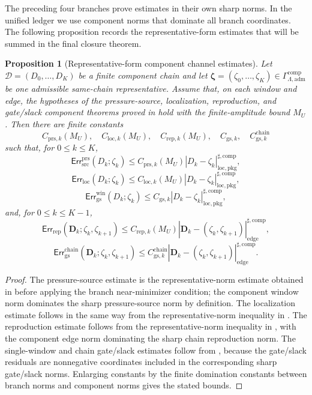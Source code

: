 \documentclass[11pt]{article}
\numberwithin{equation}{section}
\newtheorem{proposition}[proposition]{Proposition}
\theoremstyle{definition}
\theoremstyle{remark}
\newcommand{\loc}{\mathrm{loc}}
\newcommand{\pkg}{\mathrm{pkg}}
\newcommand{\adm}{\mathrm{adm}}
\newcommand{\prs}{\mathrm{prs}}
\newcommand{\src}{\mathrm{src}}
\newcommand{\rep}{\mathrm{rep}}
\newcommand{\gs}{\mathrm{gs}}
\newcommand{\locerr}{\mathrm{loc}}
\newcommand{\comp}{\mathrm{comp}}
\newcommand{\chain}{\mathrm{chain}}
\newcommand{\Err}{\mathsf{Err}}
\newcommand{\calD}{\mathcal D}
\newcommand{\bfD}{\mathbf D}
\newcommand{\bzeta}{\boldsymbol\zeta}
\newcommand{\Gcomp}{\Gamma_{\Lambda,\adm}^{\comp}}
\begin{document}
The preceding four branches prove estimates in their own sharp norms.  In the
unified ledger we use component norms that dominate all branch coordinates.  The
following proposition records the representative-form estimates that will be
summed in the final closure theorem.

\begin{proposition}[Representative-form component channel estimates]
\label{comp:prop:component-channel-estimates}
Let \(\calD=(D_0,\ldots,D_K)\) be a finite component chain and let
\(\bzeta=(\zeta_0,\ldots,\zeta_K)\in\Gcomp\) be one admissible same-chain
representative.  Assume that, on each window and edge, the hypotheses of the
pressure-source, localization, reproduction, and gate/slack component theorems
proved in  hold with the finite-amplitude
bound \(M_U\).  Then there are finite constants
\[
    C_{{\prs},k}(M_U),\quad
    C_{{\locerr},k}(M_U),\quad
    C_{{\rep},k}(M_U),\quad
    C_{{\gs},k},\quad
    C_{{\gs},k}^{\chain}
\]
such that, for \(0\le k\le K\),
\[
    \Err_{\src}^{\prs}(D_k;\zeta_k)
    \le
    C_{{\prs},k}(M_U)
    |D_k-\zeta_k|_{\loc,\pkg}^{\sharp,\comp},
\]
\[
    \Err_{\locerr}(D_k;\zeta_k)
    \le
    C_{{\locerr},k}(M_U)
    |D_k-\zeta_k|_{\loc,\pkg}^{\sharp,\comp},
\]
\[
    \Err_{\gs}^{\mathrm{win}}(D_k;\zeta_k)
    \le
    C_{{\gs},k}
    |D_k-\zeta_k|_{\loc,\pkg}^{\sharp,\comp},
\]
and, for \(0\le k\le K-1\),
\[
    \Err_{\rep}(\bfD_k;\zeta_k,\zeta_{k+1})
    \le
    C_{{\rep},k}(M_U)
    |\bfD_k-(\zeta_k,\zeta_{k+1})|_{\mathrm{edge}}^{\sharp,\comp},
\]
\[
    \Err_{\gs}^{\chain}(\bfD_k;\zeta_k,\zeta_{k+1})
    \le
    C_{{\gs},k}^{\chain}
    |\bfD_k-(\zeta_k,\zeta_{k+1})|_{\mathrm{edge}}^{\sharp,\comp}.
\]
\end{proposition}

\begin{proof}
The pressure-source estimate is the representative-norm estimate obtained in
 before applying the
branch near-minimizer condition; the component window norm dominates the sharp
pressure-source norm by definition.  The localization estimate follows in the
same way from the representative-norm inequality in
.  The reproduction
estimate follows from the representative-norm inequality in
, with the component
edge norm dominating the sharp chain reproduction norm.  The single-window and
chain gate/slack estimates follow from
,
because the gate/slack residuals are nonnegative coordinates included in the
corresponding sharp gate/slack norms.  Enlarging constants by the finite
domination constants between branch norms and component norms gives the stated
bounds.
\end{proof}
\end{document}

